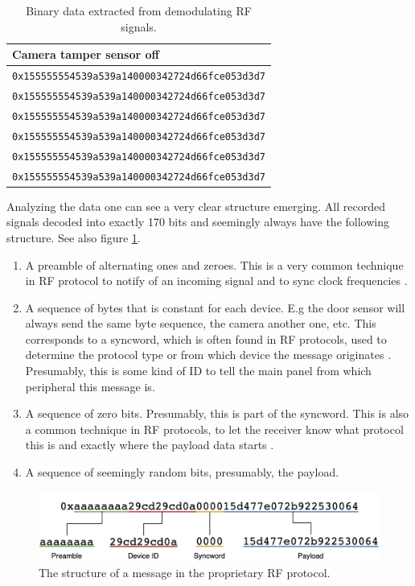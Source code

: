 \begin{table}[!p]
\begin{tabularx}{\textwidth}{l}
        \textbf{Camera tamper sensor off} \\ \hline
        \texttt{0x155555554539a539a140000342724d66fce053d3d7} \\
        \texttt{0x155555554539a539a140000342724d66fce053d3d7} \\
        \texttt{0x155555554539a539a140000342724d66fce053d3d7} \\
        \texttt{0x155555554539a539a140000342724d66fce053d3d7} \\
        \texttt{0x155555554539a539a140000342724d66fce053d3d7} \\
        \texttt{0x155555554539a539a140000342724d66fce053d3d7} \\
        \hline
    \end{tabularx}
    \caption{Binary data extracted from demodulating RF signals.}
    \label{tb:demodulated-data}
\end{table}
Analyzing the data one can see a very clear structure emerging. All recorded signals decoded into exactly 170 bits and seemingly always have the following structure. See also figure \ref{fig:rf-message-structure}.
\begin{enumerate}
    \item A preamble of alternating ones and zeroes. This is a very common technique in RF protocol to notify of an incoming signal and to sync clock frequencies \cite{hacking-the-iot-talk}.
    \item A sequence of bytes that is constant for each device. E.g the door sensor will always send the same byte sequence, the camera another one, etc. This corresponds to a syncword, which is often found in RF protocols, used to determine the protocol type or from which device the message originates \cite{hacking-the-iot-talk}. Presumably, this is some kind of ID to tell the main panel from which peripheral this message is.
    \item A sequence of zero bits. Presumably, this is part of the syncword. This is also a common technique in RF protocols, to let the receiver know what protocol this is and exactly where the payload data starts \cite{hacking-the-iot-talk}.
    \item A sequence of seemingly random bits, presumably, the payload.
\end{enumerate}
\begin{figure}[!ht]
    \centering
    \includegraphics[width=\textwidth]{images/6-pentesting/rf-message-structure.png}
    \caption{The structure of a message in the proprietary RF protocol.}
    \label{fig:rf-message-structure}
\end{figure}
